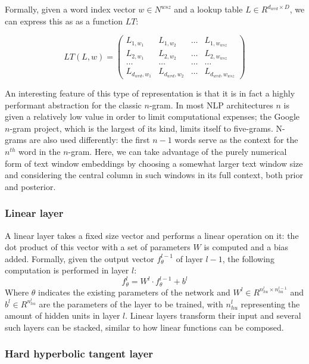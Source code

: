 Formally, given a word index vector $w \in N^{wsz}$ and a lookup table
$L \in R^{d_{wrd} \times D}$, we can express this as as a function
$LT$:

\begin{equation} \label{eq:ltmatrix} LT(L, w) =
\left( \begin{array}{cccc} L_{1,w_1} & L_{1,w_2} & \ldots &
L_{1,w_{wsz}} \\ L_{2,w_1} & L_{2,w_2} & \ldots & L_{2,w_{wsz}} \\
\ldots & \ldots & \ldots & \ldots \\ L_{d_{wrd},w_1} & L_{d_{wrd},w_2}
& \ldots & L_{d_{wrd},w_{wsz}} \end{array} \right)
\end{equation}

An interesting feature of this type of representation is that it is in
fact a highly performant abstraction for the classic $n$-gram. In most
NLP architectures $n$ is given a relatively low value in order to
limit computational expenses; the Google $n$-gram project, which is the
largest of its kind, limits itself to five-grams. N-grams are also
used differently: the first $n - 1$ words serve as the context for the
$n^{th}$ word in the $n$-gram. Here, we can take advantage of the
purely numerical form of text window embeddings by choosing a somewhat
larger text window size and considering the central column in such
windows in its full context, both prior and posterior.

\subsubsection{Linear layer}
A linear layer takes a fixed size vector and performs a linear
operation on it: the dot product of this vector with a set of
parameters $W$ is computed and a bias added. Formally, given the
output vector $f^{l-1}_\theta$ of layer $l-1$, the following
computation is performed in layer $l$:
\begin{equation}
  f^l_\theta = W^l \cdot f^{l-1}_\theta + b^l
\end{equation}
Where $\theta$ indicates the existing parameters of the network and
$W^l \in R^{n^l_{hu} \times n^{l-1}_{hu}} $ and $b^l \in R^{n^l_{hu}} $
are the parameters of the layer to be trained, with $n^l_{hu}$
representing the amount of hidden units in layer $l$. Linear layers
transform their input and several such layers can be stacked, similar
to how linear functions can be composed.

\subsubsection{Hard hyperbolic tangent layer}

